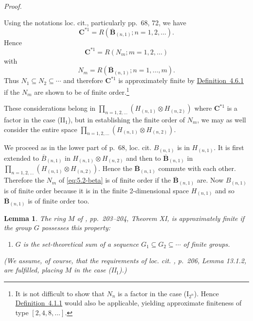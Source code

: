 \documentclass[b5paper,twoside]{article}
\newcommand{\defref}[2]{\hyperref[#1]{\mbox{Definition~#2}}}
\theoremstyle{mvnplain}
\newtheorem{lemma}{Lemma}[section]
\renewenvironment{proof}[1][Proof]{%
  \par\addvspace{0.35\baselineskip}%
  \noindent\textit{#1.}\ \normalfont\ignorespaces
}{%
  \par\addvspace{0.35\baselineskip}%
}
\newcommand{\M}{\mathbf M}
\newcommand{\N}{\mathbf N}
\newcommand{\R}{\mathbf R}
\newcommand{\Hilbert}{\mathfrak H}
\def\M{M}%
\def\N{N}%
\def\R{R}%
\def\Hilbert{H}%
\def\mathfrak#1{#1}%
\begin{document}
\begin{proof}
Using the notations loc. cit., particularly pp.~68, 72, we have
\[
 \mathbf C^{*1}=\R(\overline{\mathbf B}_{(n,1)};n=1,2,\ldots).
\]
Hence
\begin{equation}\tag{5.2.\(\alpha\)}\label{eq:5.2-alpha}
 \mathbf C^{*1}=\R(\N_m;m=1,2,\ldots)
\end{equation}
with
\begin{equation}\tag{5.2.\(\beta\)}\label{eq:5.2-beta}
 \N_m=\R(\overline{\mathbf B}_{(n,1)};n=1,\ldots,m).
\end{equation}
Thus \(\N_1\subseteq\N_2\subseteq\cdots\) and therefore
\(\mathbf C^{*1}\) is approximately finite by \defref{def:4.6.1}{4.6.1} if
the \(\N_m\) are shown to be of finite order.\footnote{\label{fn:44}It is not difficult to
show that \(\N_n\) is a factor in the case (I\(_{2^n}\)). Hence
\defref{def:4.1.1}{4.1.1} would also be applicable, yielding approximate
finiteness of type \([2,4,8,\ldots]\).}

These considerations belong in
\(\prod_{n=1,2,\ldots}(\Hilbert_{(n,1)}\otimes\Hilbert_{(n,2)})\) where
\(\mathbf C^{*1}\) is a factor in the case (II\(_1\)), but in establishing
the finite order of \(\N_m\), we may as well consider the entire space
\(\prod_{n=1,2,\ldots}(\Hilbert_{(n,1)}\otimes\Hilbert_{(n,2)})\).

We proceed as in the lower part of p.~68, loc. cit.
\(B_{(n,1)}\) is in \(\Hilbert_{(n,1)}\). It is first extended to
\(\overline B_{(n,1)}\) in
\(\Hilbert_{(n,1)}\otimes\Hilbert_{(n,2)}\) and then to
\(\overline{\mathbf B}_{(n,1)}\) in
\(\prod_{n=1,2,\ldots}(\Hilbert_{(n,1)}\otimes\Hilbert_{(n,2)})\). Hence the
\(\overline{\mathbf B}_{(n,1)}\) commute with each other. Therefore the
\(\N_m\) of \eqref{eq:5.2-beta} is of finite order if the
\(\overline{\mathbf B}_{(n,1)}\) are. Now \(B_{(n,1)}\) is of finite order
because it is in the finite 2-dimensional space \(\Hilbert_{(n,1)}\) and so
\(\overline{\mathbf B}_{(n,1)}\) is of finite order too.
\end{proof}

\begin{lemma}\label{lem:5.2.2}
The ring \(\M\) of \cite{ref5}, pp.~203--204, Theorem XI, is
approximately finite if the group \(\mathfrak G\) possesses this property:
\begin{enumerate}[label=(\roman*)]
\item \(\mathfrak G\) is the set-theoretical sum of a sequence
\(\mathfrak G_1\subseteq\mathfrak G_2\subseteq\cdots\) of finite groups.
\end{enumerate}
(We assume, of course, that the requirements of loc. cit.
\cite{ref5}, p.~206, Lemma 13.1.2, are fulfilled, placing \(\M\) in
the case (II\(_1\)).)
\end{lemma}
\end{document}
